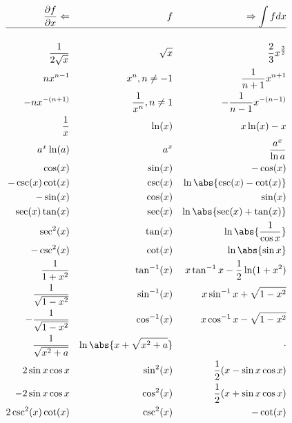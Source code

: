 \begin{align*}
\frac{\partial f}{\partial{x}}\Leftarrow && f                           && \Rightarrow\int f dx   \\
\hline \\
\frac{1}{2\sqrt{x}}                      && \sqrt{x}                    && \frac{2}{3}x^{\frac{3}{2}} \\
nx^{n-1}                                 && x^n, n \neq -1              && \frac{1}{n+1}x^{n+1} \\
-nx^{-(n+1)}                             && \frac{1}{x^n}, n \neq 1     && -\frac{1}{n-1}x^{-(n-1)} \\
\frac{1}{x}                              && {\ln(x)}       && x\ln(x) - x \\
a^x\ln(a)                                && a^x                         && \frac{a^x}{\ln a} \\
\cos(x)                                  && \sin(x)                     && -\cos(x) \\
-\csc(x)\cot(x)                          && \csc(x)                     && \ln\abs{\csc(x)-\cot(x)} \\
-\sin(x)                                 && \cos(x)                     && \sin(x) \\
\sec(x)\tan(x)                           && \sec(x)                     && \ln\abs{\sec(x) + \tan(x)} \\
\sec^2(x)                                && \tan(x)                     && \ln\abs{\frac{1}{\cos x}} \\
-\csc^2(x)                               && \cot(x)                     && \ln \abs{\sin x} \\
\frac{1}{1+x^2}                          && {\tan^{-1}(x)} && x\tan^{-1}x - \frac{1}{2}\ln(1+x^2) \\
\frac{1}{\sqrt{1-x^2}}                   && {\sin^{-1}(x)} && x\sin^{-1}x+ \sqrt{1-x^2} \\
-\frac{1}{\sqrt{1-x^2}}                  && {\cos^{-1}(x)} && x\cos^{-1}x -\sqrt{1-x^2} \\
\frac{1}{\sqrt{x^2+a}}                   && \ln\abs{x+\sqrt{x^2+a}}     && \cdot\\
2\sin x\cos x                            && \sin^2(x)                   && \frac{1}{2}(x - \sin x \cos x) \\
-2\sin x\cos x                           && \cos^2(x)                   && \frac{1}{2}(x + \sin x \cos x) \\
2\csc^2(x)\cot(x)                        && \csc^2(x)                   && -\cot(x) \\

\end{align*}
